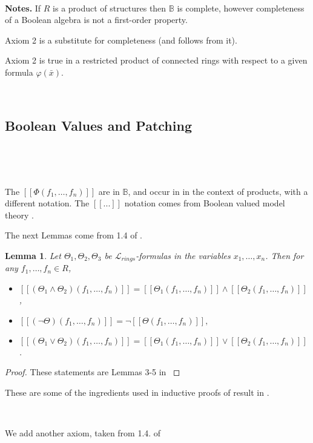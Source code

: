 \documentclass[12pt]{amsart}
\def\B{\mathbb{B}}
\def\cL{\mathcal{L}}
\def\cL{\mathcal{L}}
\newtheorem{lemma}{Lemma}[section]
\numberwithin{equation}{section}
\begin{document}
\

{\bf Notes.} If $R$ is a product of structures then $\B$ is complete, however completeness of a Boolean algebra 
is not a first-order property. 

Axiom 2 is a substitute for completeness (and follows from it). 

Axiom 2 is true in a restricted product of connected rings with respect to a given formula $\varphi(\bar x)$.

\

\subsection{Boolean Values and Patching}

\

\

The $[[\Phi(f_1,\dots,f_n)]]$ are in $\B$, and occur in \cite{FV} in the context of products, 
with a different notation. The $[[...]]$ notation comes from Boolean valued model theory \cite{}.

The next Lemmas come from 1.4 of \cite{elem-prod}.

\begin{lemma}\label{lem3-5} Let $\Theta_1,\Theta_2,\Theta_3$ be $\cL_{rings}$-formulas in the variables $x_1,\dots,x_n$. 
Then for any $f_1,\dots,f_n \in R$, \begin{itemize}
\item $[[(\Theta_1 \wedge \Theta_2)(f_1,\dots,f_n)]]=[[\Theta_1(f_1,\dots,f_n)]]\wedge [[\Theta_2(f_1,\dots,f_n)]]$,
\item $[[(\neg \Theta)(f_1,\dots,f_n)]]=\neg [[\Theta(f_1,\dots,f_n)]],$
\item $[[(\Theta_1 \vee \Theta_2)(f_1,\dots,f_n)]]=[[\Theta_1(f_1,\dots,f_n)]] \vee [[\Theta_2(f_1,\dots,f_n)]]$.
\end{itemize}\end{lemma}
\begin{proof} These statements are Lemmas 3-5 in \cite{elem-prod}
\end{proof}

These are some of the ingredients used in inductive proofs of result in \cite{FV}.

\

We add another axiom, taken from 1.4. of \cite{elem-prod}
\end{document}
